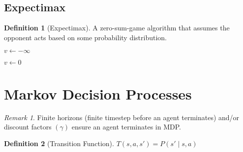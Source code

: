 \documentclass[11pt]{article}
\theoremstyle{definition}
\newtheorem{definition}{Definition}[section]
\theoremstyle{remark}
\newtheorem*{remark}{Remark}
\begin{document}
\subsection{Expectimax}
\begin{definition}[Expectimax]
A zero-sum-game algorithm that assumes the opponent acts based on some probability distribution.
\end{definition}
\begin{algorithm} [ht]
    \caption{Expectimax.}
    
    \DontPrintSemicolon
    
    
     {
		$v \gets -\infty$ \\
		    
    }
    
     {
    	$v \gets 0$ \\
		    
    }
\end{algorithm}
\clearpage

\section{Markov Decision Processes}
\begin{remark}
Finite horizons (finite timestep before an agent terminates) and/or discount factors $(\gamma)$ ensure an agent terminates in MDP.
\end{remark}

\begin{definition}[Transition Function]
$T(s,a,s')=P(s' \mid s,a)$
\end{definition}
\end{document}
